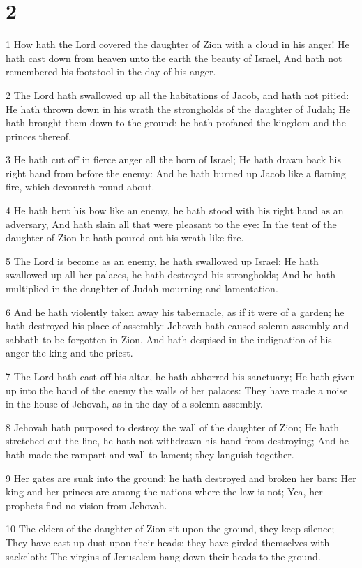 \chapter{2}

\par 1 How hath the Lord covered the daughter of Zion with a cloud in his anger! He hath cast down from heaven unto the earth the beauty of Israel, And hath not remembered his footstool in the day of his anger.
\par 2 The Lord hath swallowed up all the habitations of Jacob, and hath not pitied: He hath thrown down in his wrath the strongholds of the daughter of Judah; He hath brought them down to the ground; he hath profaned the kingdom and the princes thereof.
\par 3 He hath cut off in fierce anger all the horn of Israel; He hath drawn back his right hand from before the enemy: And he hath burned up Jacob like a flaming fire, which devoureth round about.
\par 4 He hath bent his bow like an enemy, he hath stood with his right hand as an adversary, And hath slain all that were pleasant to the eye: In the tent of the daughter of Zion he hath poured out his wrath like fire.
\par 5 The Lord is become as an enemy, he hath swallowed up Israel; He hath swallowed up all her palaces, he hath destroyed his strongholds; And he hath multiplied in the daughter of Judah mourning and lamentation.
\par 6 And he hath violently taken away his tabernacle, as if it were of a garden; he hath destroyed his place of assembly: Jehovah hath caused solemn assembly and sabbath to be forgotten in Zion, And hath despised in the indignation of his anger the king and the priest.
\par 7 The Lord hath cast off his altar, he hath abhorred his sanctuary; He hath given up into the hand of the enemy the walls of her palaces: They have made a noise in the house of Jehovah, as in the day of a solemn assembly.
\par 8 Jehovah hath purposed to destroy the wall of the daughter of Zion; He hath stretched out the line, he hath not withdrawn his hand from destroying; And he hath made the rampart and wall to lament; they languish together.
\par 9 Her gates are sunk into the ground; he hath destroyed and broken her bars: Her king and her princes are among the nations where the law is not; Yea, her prophets find no vision from Jehovah.
\par 10 The elders of the daughter of Zion sit upon the ground, they keep silence; They have cast up dust upon their heads; they have girded themselves with sackcloth: The virgins of Jerusalem hang down their heads to the ground.
